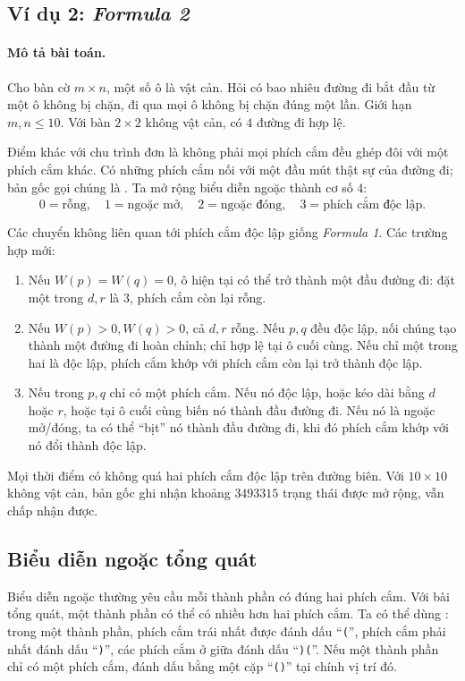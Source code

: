 \documentclass[11pt]{article}
\begin{document}
\subsection{Ví dụ 2: \textit{Formula 2}}

\paragraph{Mô tả bài toán.}
Cho bàn cờ \(m\times n\), một số ô là vật cản. Hỏi có bao nhiêu đường đi bắt
đầu từ một ô không bị chặn, đi qua mọi ô không bị chặn đúng một lần. Giới hạn
\(m,n\le 10\). Với bàn \(2\times2\) không vật cản, có \(4\) đường đi hợp lệ.

Điểm khác với chu trình đơn là không phải mọi phích cắm đều ghép đôi với một
phích cắm khác. Có những phích cắm nối với một đầu mút thật sự của đường đi;
bản gốc gọi chúng là . Ta mở rộng biểu diễn ngoặc
thành cơ số \(4\):
\[
  0=\text{rỗng},\quad
  1=\text{ngoặc mở},\quad
  2=\text{ngoặc đóng},\quad
  3=\text{phích cắm độc lập}.
\]

Các chuyển không liên quan tới phích cắm độc lập giống \textit{Formula 1}. Các
trường hợp mới:
\begin{enumerate}
  \item Nếu \(W(p)=W(q)=0\), ô hiện tại có thể trở thành một đầu đường đi: đặt
  một trong \(d,r\) là \(3\), phích cắm còn lại rỗng.
  \item Nếu \(W(p)>0,W(q)>0\), cả \(d,r\) rỗng. Nếu \(p,q\) đều độc lập, nối
  chúng tạo thành một đường đi hoàn chỉnh; chỉ hợp lệ tại ô cuối cùng. Nếu chỉ
  một trong hai là độc lập, phích cắm khớp với phích cắm còn lại trở thành
  độc lập.
  \item Nếu trong \(p,q\) chỉ có một phích cắm. Nếu nó độc lập, hoặc kéo dài
  bằng \(d\) hoặc \(r\), hoặc tại ô cuối cùng biến nó thành đầu đường đi. Nếu
  nó là ngoặc mở/đóng, ta có thể ``bịt'' nó thành đầu đường đi, khi đó phích
  cắm khớp với nó đổi thành độc lập.
\end{enumerate}

Mọi thời điểm có không quá hai phích cắm độc lập trên đường biên. Với
\(10\times10\) không vật cản, bản gốc ghi nhận khoảng \(3493315\) trạng thái
được mở rộng, vẫn chấp nhận được.

\subsection{Biểu diễn ngoặc tổng quát}

Biểu diễn ngoặc thường yêu cầu mỗi thành phần có đúng hai phích cắm. Với bài
tổng quát, một thành phần có thể có nhiều hơn hai phích cắm. Ta có thể dùng
: trong một thành phần, phích cắm trái nhất
được đánh dấu ``\texttt{(}'', phích cắm phải nhất đánh dấu ``\texttt{)}'', các
phích cắm ở giữa đánh dấu ``\texttt{)(}''. Nếu một thành phần chỉ có một phích
cắm, đánh dấu bằng một cặp ``\texttt{()}'' tại chính vị trí đó.
\end{document}
